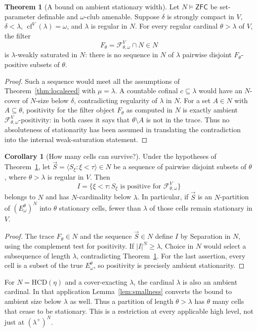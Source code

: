 \documentclass[11pt,letterpaper]{article}
\theoremstyle{definition}
\newtheorem{theorem}[definition]{Theorem}
\newtheorem{corollary}[definition]{Corollary}
\numberwithin{equation}{section}
\newcommand{\ZFC}{\mathsf{ZFC}}
\newcommand{\HCD}{\mathrm{HCD}}
\newcommand{\cf}{\operatorname{cf}}
\newcommand{\calF}{\mathcal F}
\begin{document}
\begin{theorem}[A bound on ambient stationary width]\label{thm:width}
Let $N\models\ZFC$ be set-parameter definable and $\omega$-club
amenable. Suppose $\delta$ is strongly compact in $V$,
$\delta<\lambda$, $\cf^V(\lambda)=\omega$, and $\lambda$ is regular
in $N$. For every regular cardinal $\theta>\lambda$ of $V$, the filter
\[
F_\theta=\calF^V_{\theta,\omega}\cap N\in N
\]
is $\lambda$-weakly saturated in $N$: there is no sequence in $N$ of
$\lambda$ pairwise disjoint $F_\theta$-positive subsets of $\theta$.
\end{theorem}
\begin{proof}
Such a sequence would meet all the assumptions of
Theorem~\ref{thm:localseed} with $\mu=\lambda$. A countable cofinal
$c\subseteq\lambda$ would have an $N$-cover of $N$-size below
$\delta$, contradicting regularity of $\lambda$ in $N$.
For a set $A\in N$ with $A\subseteq\theta$, positivity for the filter
object $F_\theta$ as computed in $N$ is exactly ambient
$\calF^V_{\theta,\omega}$-positivity: in both cases it says that
$\theta\setminus A$ is not in the trace. Thus no absoluteness of
stationarity has been assumed in translating the contradiction into
the internal weak-saturation statement.
\end{proof}

\begin{corollary}[How many cells can survive?]\label{cor:survivors}
Under the hypotheses of Theorem~\ref{thm:width}, let
$\vec S=\langle S_\xi:\xi<\tau\rangle\in N$ be a sequence of pairwise
disjoint subsets of $\theta$, where $\theta>\lambda$ is regular in
$V$. Then
\[
I=\{\xi<\tau:S_\xi\text{ is positive for }
\calF^V_{\theta,\omega}\}
\]
belongs to $N$ and has $N$-cardinality below $\lambda$.
In particular, if $\vec S$ is an $N$-partition of
$(E^\theta_\omega)^N$ into $\theta$ stationary cells, fewer than
$\lambda$ of those cells remain stationary in $V$.
\end{corollary}
\begin{proof}
The trace $F_\theta\in N$ and the sequence $\vec S\in N$ define
$I$ by Separation in $N$, using the complement test for positivity.
If $|I|^N\ge\lambda$, Choice in $N$ would select a subsequence of
length $\lambda$, contradicting Theorem~\ref{thm:width}.
For the last assertion, every cell is a subset of the true
$E^\theta_\omega$, so positivity is precisely ambient stationarity.
\end{proof}

For $N=\HCD(\eta)$ and a cover-exacting $\lambda$, the cardinal
$\lambda$ is also an ambient cardinal. In that application
Lemma~\ref{lem:smallness} converts the bound to ambient size below
$\lambda$ as well. Thus a partition of length $\theta>\lambda$ has
$\theta$ many cells that cease to be stationary. This is a restriction
at every applicable high level, not just at $(\lambda^+)^N$.
\end{document}
